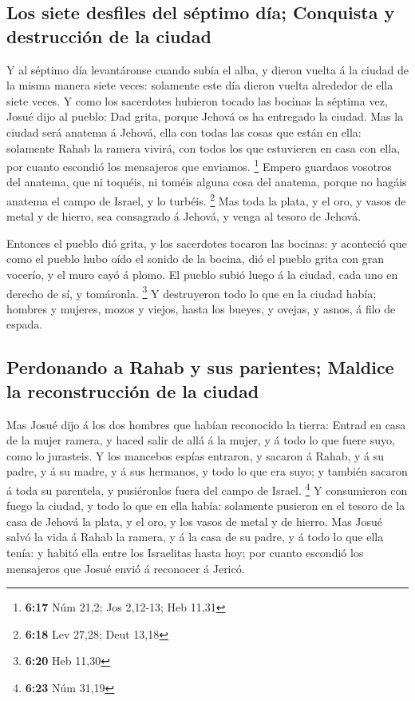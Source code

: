\hypertarget{los-siete-desfiles-del-suxe9ptimo-duxeda-conquista-y-destrucciuxf3n-de-la-ciudad}{%
\subsection{Los siete desfiles del séptimo día; Conquista y destrucción
de la
ciudad}\label{los-siete-desfiles-del-suxe9ptimo-duxeda-conquista-y-destrucciuxf3n-de-la-ciudad}}

 Y al séptimo día levantáronse cuando subía el alba, y
dieron vuelta á la ciudad de la misma manera siete veces: solamente este
día dieron vuelta alrededor de ella siete veces.  Y como
los sacerdotes hubieron tocado las bocinas la séptima vez, Josué dijo al
pueblo: Dad grita, porque Jehová os ha entregado la ciudad.
 Mas la ciudad será anatema á Jehová, ella con todas las
cosas que están en ella: solamente Rahab la ramera vivirá, con todos los
que estuvieren en casa con ella, por cuanto escondió los mensajeros que
enviamos. \footnote{\textbf{6:17} Núm 21,2; Jos 2,12-13; Heb 11,31}
 Empero guardaos vosotros del anatema, que ni toquéis, ni
toméis alguna cosa del anatema, porque no hagáis anatema el campo de
Israel, y lo turbéis. \footnote{\textbf{6:18} Lev 27,28; Deut 13,18}
 Mas toda la plata, y el oro, y vasos de metal y de
hierro, sea consagrado á Jehová, y venga al tesoro de Jehová.

 Entonces el pueblo dió grita, y los sacerdotes tocaron
las bocinas: y aconteció que como el pueblo hubo oído el sonido de la
bocina, dió el pueblo grita con gran vocerío, y el muro cayó á plomo. El
pueblo subió luego á la ciudad, cada uno en derecho de sí, y tomáronla.
\footnote{\textbf{6:20} Heb 11,30}  Y destruyeron todo lo
que en la ciudad había; hombres y mujeres, mozos y viejos, hasta los
bueyes, y ovejas, y asnos, á filo de espada.

\hypertarget{perdonando-a-rahab-y-sus-parientes-maldice-la-reconstrucciuxf3n-de-la-ciudad}{%
\subsection{Perdonando a Rahab y sus parientes; Maldice la
reconstrucción de la
ciudad}\label{perdonando-a-rahab-y-sus-parientes-maldice-la-reconstrucciuxf3n-de-la-ciudad}}

 Mas Josué dijo á los dos hombres que habían reconocido
la tierra: Entrad en casa de la mujer ramera, y haced salir de allá á la
mujer, y á todo lo que fuere suyo, como lo jurasteis.  Y
los mancebos espías entraron, y sacaron á Rahab, y á su padre, y á su
madre, y á sus hermanos, y todo lo que era suyo; y también sacaron á
toda su parentela, y pusiéronlos fuera del campo de Israel. \footnote{\textbf{6:23}
  Núm 31,19}  Y consumieron con fuego la ciudad, y todo
lo que en ella había: solamente pusieron en el tesoro de la casa de
Jehová la plata, y el oro, y los vasos de metal y de hierro.
 Mas Josué salvó la vida á Rahab la ramera, y á la casa
de su padre, y á todo lo que ella tenía: y habitó ella entre los
Israelitas hasta hoy; por cuanto escondió los mensajeros que Josué envió
á reconocer á Jericó.

